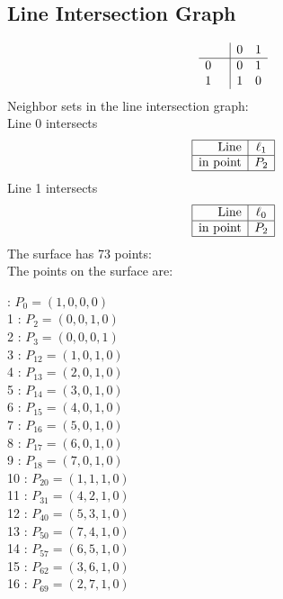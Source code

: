 \documentclass{article}
\begin{document}
{\subsection*{Line Intersection Graph}
{\arraycolsep=1pt
$$
\begin{array}{rr|*{2}r}
 &  & 0 & 1\\
\hline
0 &  & 0 & 1\\
1 &  & 1 & 0\\
\end{array}
$$
}%
Neighbor sets in the line intersection graph:\\
Line 0 intersects 
$$
\begin{array}{|r*{1}{|c}|}
\hline
\mbox{Line}  & \ell_{1}\\
\hline
\mbox{in point}  & P_{2}\\
\hline
\end{array}
$$
Line 1 intersects 
$$
\begin{array}{|r*{1}{|c}|}
\hline
\mbox{Line}  & \ell_{0}\\
\hline
\mbox{in point}  & P_{2}\\
\hline
\end{array}
$$
The surface has 73 points:\\
The points on the surface are:\\
\begin{multicols}{3}
 : $P_{0}=( 1, 0, 0, 0 )$\\
1 : $P_{2}=( 0, 0, 1, 0 )$\\
2 : $P_{3}=( 0, 0, 0, 1 )$\\
3 : $P_{12}=( 1, 0, 1, 0 )$\\
4 : $P_{13}=( 2, 0, 1, 0 )$\\
5 : $P_{14}=( 3, 0, 1, 0 )$\\
6 : $P_{15}=( 4, 0, 1, 0 )$\\
7 : $P_{16}=( 5, 0, 1, 0 )$\\
8 : $P_{17}=( 6, 0, 1, 0 )$\\
9 : $P_{18}=( 7, 0, 1, 0 )$\\
10 : $P_{20}=( 1, 1, 1, 0 )$\\
11 : $P_{31}=( 4, 2, 1, 0 )$\\
12 : $P_{40}=( 5, 3, 1, 0 )$\\
13 : $P_{50}=( 7, 4, 1, 0 )$\\
14 : $P_{57}=( 6, 5, 1, 0 )$\\
15 : $P_{62}=( 3, 6, 1, 0 )$\\
16 : $P_{69}=( 2, 7, 1, 0 )$\\

\end{multicols}}
\end{document}
